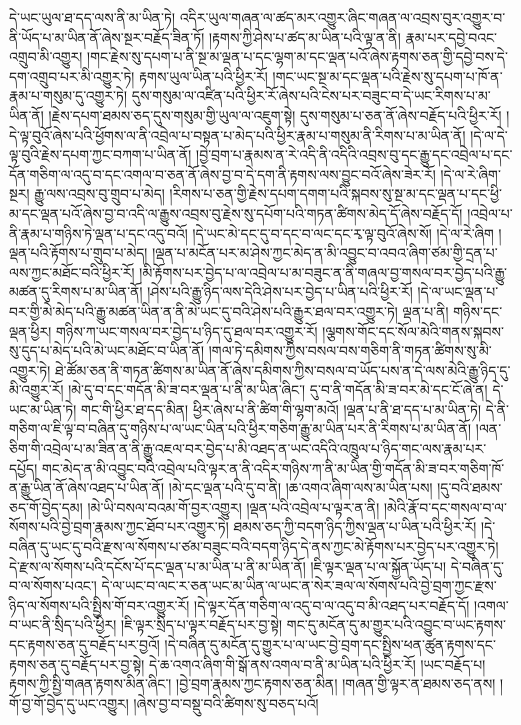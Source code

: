 དེ་ཡང་ཡུལ་ཐ་དད་ལས་ནི་མ་ཡིན་ཏེ། འདིར་ཡུལ་གཞན་ལ་ཚད་མར་འགྱུར་ཞིང་གཞན་ལ་འབྲས་བུར་འགྱུར་བ་ནི་ཡོད་པ་མ་ཡིན་ནོ་ཞེས་སྔར་བརྗོད་ཟིན་ཏོ། །རྟགས་ཀྱི་ཤེས་པ་ཚད་མ་ཡིན་པའི་ལྟ་ན་ནི། རྣམ་པར་དབྱེ་བའང་འགྲུབ་མི་འགྱུར། །གང་རྗེས་སུ་དཔག་པ་ནི་སྔ་མ་ལྡན་པ་དང་ལྷག་མ་དང་ལྡན་པའོ་ཞེས་རྟགས་ཅན་གྱི་དབྱེ་བས་དེ་དག་འགྲུབ་པར་མི་འགྱུར་ཏེ། རྟགས་ཡུལ་ཡིན་པའི་ཕྱིར་རོ། །གང་ཡང་སྔ་མ་དང་ལྡན་པའི་རྗེས་སུ་དཔག་པ་ཁོ་ན་རྣམ་པ་གསུམ་དུ་འགྱུར་ཏེ། དུས་གསུམ་ལ་འཛིན་པའི་ཕྱིར་རོ་ཞེས་པའི་ངེས་པར་བཟུང་བ་དེ་ཡང་རིགས་པ་མ་ཡིན་ནོ། །རྗེས་དཔག་ཐམས་ཅད་དུས་གསུམ་གྱི་ཡུལ་ལ་འཇུག་སྟེ། དུས་གསུམ་པ་ཅན་ནོ་ཞེས་བརྗོད་པའི་ཕྱིར་རོ། །དེ་ལྟ་བུའོ་ཞེས་པའི་ཕྱོགས་ལ་ནི་འབྲེལ་པ་བསྟན་པ་མེད་པའི་ཕྱིར་རྣམ་པ་གསུམ་ནི་རིགས་པ་མ་ཡིན་ནོ། །དེ་ལ་དེ་ལྟ་བུའི་རྗེས་དཔག་ཀྱང་བཀག་པ་ཡིན་ནོ། །བྱེ་བྲག་པ་རྣམས་ན་རེ་འདི་ནི་འདིའི་འབྲས་བུ་དང་རྒྱུ་དང་འབྲེལ་པ་དང་དོན་གཅིག་ལ་འདུ་བ་དང་འགལ་བ་ཅན་ནོ་ཞེས་བྱ་བ་དེ་དག་ནི་རྟགས་ལས་བྱུང་བའོ་ཞེས་ཟེར་རོ། །དེ་ལ་རེ་ཞིག་སྔར། རྒྱུ་ལས་འབྲས་བུ་གྲུབ་པ་མེད། །རིགས་པ་ཅན་གྱི་རྗེས་དཔག་དགག་པའི་སྐབས་སུ་སྔ་མ་དང་ལྡན་པ་དང་ཕྱི་མ་དང་ལྡན་པའོ་ཞེས་བྱ་བ་འདི་ལ་རྒྱུས་འབྲས་བུ་རྗེས་སུ་དཔོག་པའི་གཏན་ཚིགས་མེད་དོ་ཞེས་བརྗོད་དོ། །འབྲེལ་པ་ནི་རྣམ་པ་གཉིས་ཏེ་ལྡན་པ་དང་འདུ་བའོ། །དེ་ཡང་མེ་དང་དུ་བ་དང་བ་ལང་དང་རྭ་ལྟ་བུའོ་ཞེས་སོ། །དེ་ལ་རེ་ཞིག །ལྡན་པའི་རྟོགས་པ་གྲུབ་པ་མེད། །ལྡན་པ་མངོན་པར་མ་ཤེས་ཀྱང་མེད་ན་མི་འབྱུང་བ་འབའ་ཞིག་ཙམ་གྱི་དྲན་པ་ལས་ཀྱང་མཐོང་བའི་ཕྱིར་རོ། །མི་རྟོགས་པར་བྱེད་པ་ལ་འབྲེལ་པ་མ་བཟུང་ན་ནི་གཞལ་བྱ་གསལ་བར་བྱེད་པའི་རྒྱུ་མཚན་དུ་རིགས་པ་མ་ཡིན་ནོ། །ཤེས་པའི་རྒྱུ་ཉིད་ལས་དེའི་ཤེས་པར་བྱེད་པ་ཡིན་པའི་ཕྱིར་རོ། །དེ་ལ་ཡང་ལྡན་པ་བར་གྱི་མེ་མེད་པའི་རྒྱུ་མཚན་ཡིན་ན་ནི་མེ་ཡང་དུ་བའི་ཤེས་པའི་རྒྱུར་ཐལ་བར་འགྱུར་ཏེ། ལྡན་པ་ནི། གཉིས་དང་ལྡན་ཕྱིར། གཉིས་ཀ་ཡང་གསལ་བར་བྱེད་པ་ཉིད་དུ་ཐལ་བར་འགྱུར་རོ། །ལྕགས་གོང་དང་སོལ་མེའི་གནས་སྐབས་སུ་དུད་པ་མེད་པའི་མེ་ཡང་མཐོང་བ་ཡིན་ནོ། །གལ་ཏེ་དམིགས་ཀྱིས་བསལ་བས་གཅིག་ནི་གཏན་ཚིགས་སུ་མི་འགྱུར་ཏེ། ཐེ་ཚོམ་ཅན་ནི་གཏན་ཚིགས་མ་ཡིན་ནོ་ཞེས་དམིགས་ཀྱིས་བསལ་བ་ཡོད་པས་ན་དེ་ལས་མེའི་རྒྱུ་ཉིད་དུ་མི་འགྱུར་རོ། །མེ་དུ་བ་དང་གདོན་མི་ཟ་བར་ལྡན་པ་ནི་མ་ཡིན་ཞིང་། དུ་བ་ནི་གདོན་མི་ཟ་བར་མེ་དང་ངོ་ཞེ་ན། དེ་ཡང་མ་ཡིན་ཏེ། གང་གི་ཕྱིར་ཐ་དད་མིན། ཕྱིར་ཞེས་པ་ནི་ཚིག་གི་ལྷག་མའོ། །ལྡན་པ་ནི་ཐ་དད་པ་མ་ཡིན་ཏེ། དེ་ནི་གཅིག་ལ་ཇི་ལྟ་བ་བཞིན་དུ་གཉིས་པ་ལ་ཡང་ཡིན་པའི་ཕྱིར་གཅིག་རྒྱུ་མ་ཡིན་པར་ནི་རིགས་པ་མ་ཡིན་ནོ། །ལན་ཅིག་གི་འབྲེལ་པ་མ་ཟིན་ན་ནི་རྒྱུ་འཇལ་བར་བྱེད་པ་མི་འཐད་ན་ཡང་འདིའི་འཁྲུལ་པ་ཉིད་གང་ལས་རྣམ་པར་དཔྱོད། གང་མེད་ན་མི་འབྱུང་བའི་འབྲེལ་པའི་ལྟར་ན་ནི་འདིར་གཉིས་ཀ་ནི་མ་ཡིན་གྱི་གདོན་མི་ཟ་བར་གཅིག་ཁོ་ན་རྒྱུ་ཡིན་ནོ་ཞེས་འཐད་པ་ཡིན་ནོ། །མེ་དང་ལྡན་པའི་དུ་བ་ནི། །ཆ་འགའ་ཞིག་ལས་མ་ཡིན་པས། །དུ་བའི་ཐམས་ཅད་གོ་བྱེད་དམ། །མེ་ཡི་བསལ་བའམ་གོ་བྱར་འགྱུར། །ལྡན་པའི་འབྲེལ་པ་ལྟར་ན་ནི། །མེའི་རྣོ་བ་དང་གསལ་བ་ལ་སོགས་པའི་བྱེ་བྲག་རྣམས་ཀྱང་ཐོབ་པར་འགྱུར་ཏེ། ཐམས་ཅད་ཀྱི་བདག་ཉིད་ཀྱིས་ལྡན་པ་ཡིན་པའི་ཕྱིར་རོ། །དེ་བཞིན་དུ་ཡང་དུ་བའི་རྫས་ལ་སོགས་པ་ཙམ་བཟུང་བའི་བདག་ཉིད་དེ་ནས་ཀྱང་མེ་རྟོགས་པར་བྱེད་པར་འགྱུར་ཏེ། དེ་རྫས་ལ་སོགས་པའི་དངོས་པོ་དང་ལྡན་པ་མ་ཡིན་པ་ནི་མ་ཡིན་ནོ། །ཇི་ལྟར་ལྡན་པ་ལ་སྐྱོན་ཡོད་པ། དེ་བཞིན་དུ་བ་ལ་སོགས་པའང་། དེ་ལ་ཡང་བ་ལང་ར་ཅན་ཡང་མ་ཡིན་ལ་ཡང་ན་སེར་ཟལ་ལ་སོགས་པའི་བྱེ་བྲག་ཀྱང་རྫས་ཉིད་ལ་སོགས་པའི་སྤྱིས་གོ་བར་འགྱུར་རོ། །དེ་ལྟར་དོན་གཅིག་ལ་འདུ་བ་ལ་འདུ་བ་མི་འཐད་པར་བརྗོད་དོ། །འགལ་བ་ཡང་ནི་སྲིད་པའི་ཕྱིར། །ཇི་ལྟར་སྲིད་པ་ལྟར་བརྗོད་པར་བྱ་སྟེ། གང་དུ་མངོན་དུ་མ་གྱུར་པའི་འབྱུང་བ་ཡང་རྟགས་དང་རྟགས་ཅན་དུ་བརྗོད་པར་བྱའོ། །དེ་བཞིན་དུ་མངོན་དུ་གྱུར་པ་ལ་ཡང་བྱེ་བྲག་དང་སྤྱིས་ཕན་ཚུན་རྟགས་དང་རྟགས་ཅན་དུ་བརྗོད་པར་བྱ་སྟེ། དེ་ཆ་འགའ་ཞིག་གི་སྒོ་ནས་འགལ་བ་ནི་མ་ཡིན་པའི་ཕྱིར་རོ། །ཡང་བརྗོད་པ། རྟགས་ཀྱི་སྤྱི་གཞན་རྟགས་མིན་ཞིང་། །བྱེ་བྲག་རྣམས་ཀྱང་རྟགས་ཅན་མིན། །གཞན་གྱི་ལྟར་ན་ཐམས་ཅད་ནས། །གོ་བྱ་གོ་བྱེད་དུ་ཡང་འགྱུར། །ཞེས་བྱ་བ་བསྡུ་བའི་ཚིགས་སུ་བཅད་པའོ། 